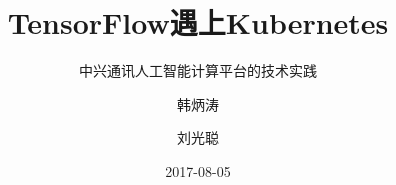 \title[TensorFlow on Kubernetes]
{TensorFlow遇上Kubernetes}

\subtitle{中兴通讯人工智能计算平台的技术实践}

\author[韩炳涛,刘光聪]
{ 韩炳涛 \and 刘光聪 
}


\date[2017.08]{2017-08-05}
